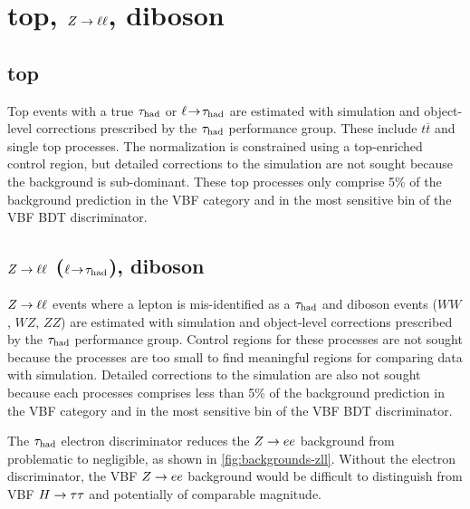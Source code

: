 \section{top, $Z \rightarrow \ell\ell$, diboson}
\label{sec:backgrounds-others}

\subsection{top}

Top events with a true $\tau_\text{had}$ or $\ell\!\rightarrow\!\tau_\text{had}$ are estimated with simulation and object-level corrections prescribed by the $\tau_\text{had}$ performance group. These include $t\overline{t}$ and single top processes. The normalization is constrained using a top-enriched control region, but detailed corrections to the simulation are not sought because the background is sub-dominant. These top processes only comprise 5\% of the background prediction in the VBF category and in the most sensitive bin of the VBF BDT discriminator.

\subsection{$Z \rightarrow \ell\ell$ ($\ell\!\rightarrow\!\tau_\text{had}$), diboson}

$Z \rightarrow \ell\ell$ events where a lepton is mis-identified as a $\tau_\text{had}$ and diboson events ($WW$, $WZ$, $ZZ$) are estimated with simulation and object-level corrections prescribed by the $\tau_\text{had}$ performance group. Control regions for these processes are not sought because the processes are too small to find meaningful regions for comparing data with simulation. Detailed corrections to the simulation are also not sought because each processes comprises less than 5\% of the background prediction in the VBF category and in the most sensitive bin of the VBF BDT discriminator.

The $\tau_\text{had}$ electron discriminator reduces the $Z \rightarrow ee$ background from problematic to negligible, as shown in \cref{fig:backgrounds-zll}. Without the electron discriminator, the VBF $Z \rightarrow ee$ background would be difficult to distinguish from VBF $H\rightarrow\tau\tau$ and potentially of comparable magnitude.

